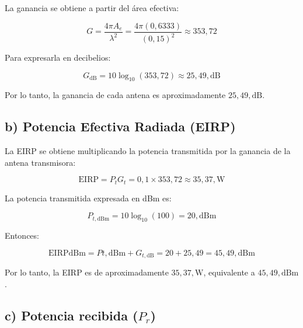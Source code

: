 \documentclass[11pt,a4paper]{article}
\begin{document}
\begin{enumerate}[label=4.\arabic*), itemsep=0.3cm]
        La ganancia se obtiene a partir del área efectiva:

        \begin{equation}
          G = \frac{4\pi A_e}{\lambda^2}
          = \frac{4\pi(0{,}6333)}{(0{,}15)^2}
          \approx 353{,}72
        \end{equation}

        Para expresarla en decibelios:

        \begin{equation}
          G_{\text{dB}} = 10\log_{10}(353{,}72)
          \approx 25{,}49,\text{dB}
        \end{equation}

        Por lo tanto, la ganancia de cada antena es aproximadamente $25{,}49,\text{dB}$.

        \subsection*{b) Potencia Efectiva Radiada (EIRP)}

        La EIRP se obtiene multiplicando la potencia transmitida por la ganancia de la antena transmisora:

        \begin{equation}
          \text{EIRP} = P_t G_t
            = 0{,}1 \times 353{,}72
          \approx 35{,}37,\text{W}
        \end{equation}

        La potencia transmitida expresada en dBm es:

        \begin{equation}
          P_{t,\text{dBm}}
          = 10\log_{10}(100)
          = 20,\text{dBm}
        \end{equation}

        Entonces:

        \begin{equation}
          \text{EIRP}{\text{dBm}}
          = P{t,\text{dBm}} + G_{t,\text{dB}}
          = 20 + 25{,}49
            = 45{,}49,\text{dBm}
        \end{equation}

        Por lo tanto, la EIRP es de aproximadamente $35{,}37,\text{W}$, equivalente a $45{,}49,\text{dBm}$.

        \subsection*{c) Potencia recibida ($P_r$)}


\end{enumerate}
\end{document}
